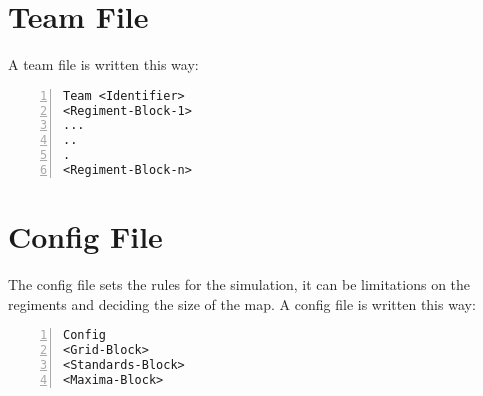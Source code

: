 \section{Team File}
\label{doc:teamfile}
	A team file is written this way: \\

		\begin{lstlisting}[basicstyle=\small\sffamily,
		keywordstyle={\color{blue}},
		comment={[l]{//}}, morecomment={[s]{/*}{*/}}, commentstyle=\itshape,
		columns={[l]flexible}, numbers=left, numberstyle=\tiny,
		frameround=fftt, frame=shadowbox, captionpos=b,
		caption={Regiment Assignment},
		label=RegimentAssignment]
Team <Identifier>
<Regiment-Block-1>
...
..
.
<Regiment-Block-n>
		\end{lstlisting}
	
\section{Config File}
\label{doc:cfgfile}
	The config file sets the rules for the simulation, it can be limitations on the regiments and deciding the size of the map.
	A config file is written this way: \\

		\begin{lstlisting}[basicstyle=\small\sffamily,
		keywordstyle={\color{blue}},
		comment={[l]{//}}, morecomment={[s]{/*}{*/}}, commentstyle=\itshape,
		columns={[l]flexible}, numbers=left, numberstyle=\tiny,
		frameround=fftt, frame=shadowbox, captionpos=b,
		caption={Config file}]
Config
<Grid-Block>
<Standards-Block>
<Maxima-Block>
		\end{lstlisting}
	
